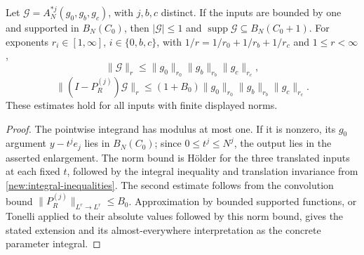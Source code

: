 \documentclass[11pt]{article}
\theoremstyle{definition}
\begin{document}
\begin{lemma}\label{new:adjoint-basic}
Let $\mathcal G=A_N^{*j}(g_0,g_b,g_c)$, with $j,b,c$ distinct. If the inputs are bounded
by one and supported in $B_N(C_0)$, then $|\mathcal G|\leq1$ and
$\operatorname{supp}\mathcal G\subseteq B_N(C_0+1)$.
For exponents $r_i\in[1,\infty]$, $i\in\{0,b,c\}$, with
$1/r=1/r_0+1/r_b+1/r_c$ and $1\leq r<\infty$,
\[
 \|\mathcal G\|_r\leq\|g_0\|_{r_0}\|g_b\|_{r_b}\|g_c\|_{r_c},
\]
\[
 \|(I-P_R^{(j)})\mathcal G\|_r
 \leq(1+B_0)\|g_0\|_{r_0}\|g_b\|_{r_b}\|g_c\|_{r_c}.
\]
These estimates hold for all inputs with finite displayed norms.
\end{lemma}
\begin{proof}
The pointwise integrand has modulus at most one. If it is nonzero, its $g_0$ argument
$y-t^je_j$ lies in $B_N(C_0)$; since $0\leq t^j\leq N^j$, the output lies in the asserted
enlargement. The norm bound is H\"older for the three translated inputs at each fixed $t$,
followed by the integral inequality and translation invariance from
\cref{new:integral-inequalities}. The second estimate follows from the convolution bound
$\|P_R^{(j)}\|_{L^r\to L^r}\leq B_0$. Approximation by bounded supported functions, or
Tonelli applied to their absolute values followed by this norm bound, gives the stated
extension and its almost-everywhere interpretation as the concrete parameter integral.
\end{proof}
\end{document}
